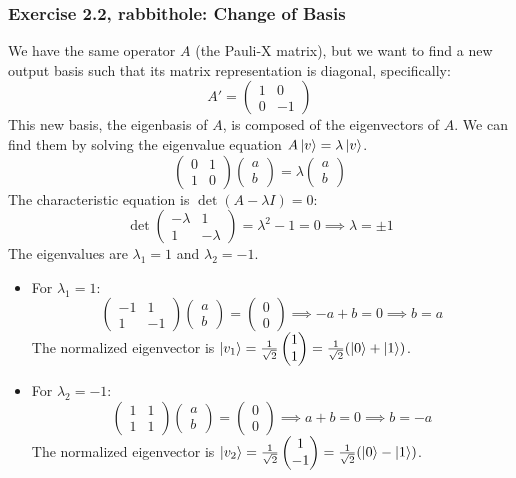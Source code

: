 \documentclass[14pt]{extarticle}
\begin{document}
\subsubsection*{Exercise 2.2, rabbithole: Change of Basis}
We have the same operator $A$ (the Pauli-X matrix), but we want to find a new output basis such that its matrix representation is diagonal, specifically:
$$ A' = \begin{pmatrix} 1 & 0 \\ 0 & -1 \end{pmatrix} $$
This new basis, the eigenbasis of $A$, is composed of the eigenvectors of $A$. We can find them by solving the eigenvalue equation $A\ket{v} = \lambda\ket{v}$.
$$ \begin{pmatrix} 0 & 1 \\ 1 & 0 \end{pmatrix} \begin{pmatrix} a \\ b \end{pmatrix} = \lambda \begin{pmatrix} a \\ b \end{pmatrix} $$
The characteristic equation is $\det(A - \lambda I) = 0$:
$$ \det \begin{pmatrix} -\lambda & 1 \\ 1 & -\lambda \end{pmatrix} = \lambda^2 - 1 = 0 \implies \lambda = \pm 1 $$
The eigenvalues are $\lambda_1 = 1$ and $\lambda_2 = -1$.
\begin{itemize}
    \item For $\lambda_1 = 1$:
    $$ \begin{pmatrix} -1 & 1 \\ 1 & -1 \end{pmatrix} \begin{pmatrix} a \\ b \end{pmatrix} = \begin{pmatrix} 0 \\ 0 \end{pmatrix} \implies -a+b=0 \implies b=a $$
    The normalized eigenvector is $\ket{v_1} = \frac{1}{\sqrt{2}}\begin{pmatrix} 1 \\ 1 \end{pmatrix} = \frac{1}{\sqrt{2}}(\ket{0} + \ket{1})$.
    \item For $\lambda_2 = -1$:
    $$ \begin{pmatrix} 1 & 1 \\ 1 & 1 \end{pmatrix} \begin{pmatrix} a \\ b \end{pmatrix} = \begin{pmatrix} 0 \\ 0 \end{pmatrix} \implies a+b=0 \implies b=-a $$
    The normalized eigenvector is $\ket{v_2} = \frac{1}{\sqrt{2}}\begin{pmatrix} 1 \\ -1 \end{pmatrix} = \frac{1}{\sqrt{2}}(\ket{0} - \ket{1})$.
\end{itemize}
\end{document}
